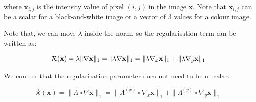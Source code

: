 \documentclass[12pt]{article}
\begin{document}



where $\mathbf{x}_{i,j}$ is the intensity value of pixel $(i,j)$ in the image $\mathbf{x}$. Note that $\mathbf{x}_{i,j}$ can be a scalar for a black-and-white image or a vector of 3 values for a colour image.

Note that, we can move $\lambda$ inside the norm, so the regularisation term can be written as:

\begin{equation}
    \mathcal{R}(\mathbf{x}) 
    = \lambda \| \nabla \mathbf{x} \|_1 \\
    = \| \lambda \nabla \mathbf{x} \|_1 \\
    = \| \lambda \nabla_x \mathbf{x} \|_1 + \| \lambda \nabla_y \mathbf{x} \|_1
\end{equation}


We can see that the regularisation parameter does not need to be a scalar.




\begin{equation}
  \mathcal{R}(\mathbf{x}) = \| \Lambda \circ \nabla \mathbf{x} \|_1
  = \| \Lambda^{(x)} \circ \nabla_x \mathbf{x} \|_1 + \| \Lambda^{(y)} \circ \nabla_y \mathbf{x} \|_1
\end{equation}
\end{document}
